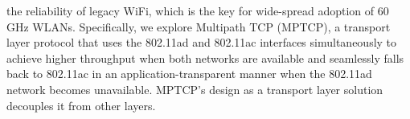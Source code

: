 the reliability of legacy WiFi, which is the key for wide-spread adoption of 60 GHz WLANs.
Specifically, we explore Multipath TCP (MPTCP), a
transport layer protocol that uses the 802.11ad and 802.11ac interfaces simultaneously to 
achieve higher throughput when both networks are available and seamlessly falls back to 
802.11ac in an application-transparent manner when the 802.11ad network becomes unavailable. 
MPTCP's design as a transport layer solution
decouples it from other layers.
\begin{comment}
In contrast, solutions that try to achieve
a similar functionality at the MAC or lower layers, such as 802.11ad's
Fast Session Transfer (FST)~\cite{80211ad}, are invariably tied to the
802.11 specifications and hence are not future proof. More
importantly, MPTCP by design provides the same guarantees to
applications as single-path TCP (SPTCP) in terms of packet delivery and
includes mechanisms to deal with issues such as packet re-ordering
among different interfaces that would otherwise need to be
addressed by any solution implemented at lower layers of the stack,
thus avoiding an unnecessary duplication of functionality.
\end{comment}

